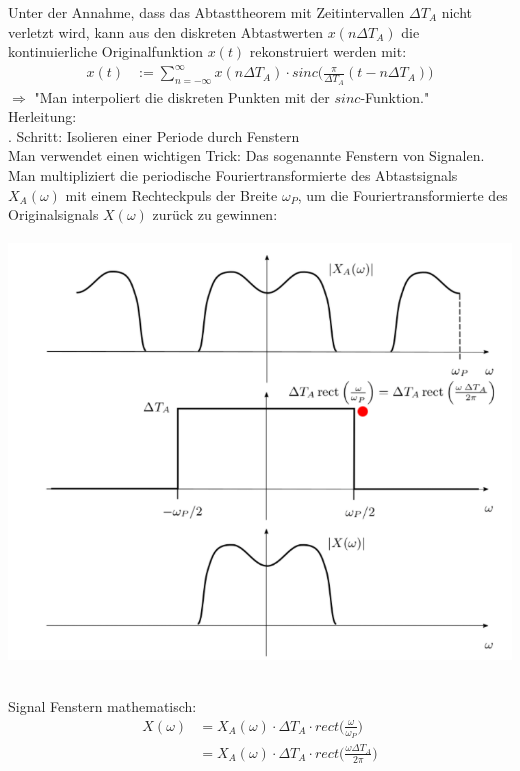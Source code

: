 \documentclass[12pt,a4paper]{scrartcl}
\begin{document}
  \noindent   Unter der Annahme, dass das Abtasttheorem mit Zeitintervallen $\Delta T_A$ nicht verletzt wird,
  kann aus den diskreten Abtastwerten $x(n \Delta T_A)$ 
  die kontinuierliche Originalfunktion $x(t)$ rekonstruiert werden mit:
  \begin{equation}
    \label{eq:15}
    \begin{split}
     x(t) &:= \sum_{n=-\infty}^{\infty} x(n \Delta T_A) \cdot sinc\Big(\frac{\pi}{\Delta T_A}(t-n\Delta T_A)\Big)
    \end{split}
  \end{equation} 
  $\Rightarrow$ "Man interpoliert die diskreten Punkten mit der $sinc$-Funktion." \\

  \noindent Herleitung: \\
  . Schritt: Isolieren einer Periode durch Fenstern\\
  Man verwendet einen wichtigen Trick: Das sogenannte Fenstern von Signalen. \\
  Man multipliziert die periodische Fouriertransformierte des Abtastsignals $X_A(\omega)$ 
  mit einem Rechteckpuls der Breite $\omega_P$, 
  um die Fouriertransformierte des Originalsignals $X(\omega)$ zurück zu gewinnen:\\
  
  \includegraphics[height = 12cm]{Pictures/Fenstern.png}

  \noindent Signal Fenstern mathematisch: \\
  \begin{equation}
    \label{eq:116}
    \begin{split}
      X(\omega) &= X_A(\omega) \cdot \Delta T_A \cdot rect\Big(\frac{\omega}{\omega_P}\Big) \\
      &= X_A(\omega) \cdot \Delta T_A \cdot rect\Big(\frac{\omega \Delta T_A}{2\pi}\Big)
    \end{split}
  \end{equation} 
\end{document}
